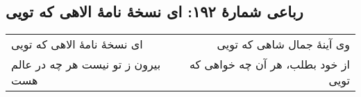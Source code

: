 \begin{center}
\section*{رباعی شمارهٔ ۱۹۲: ای نسخۀ نامۀ الاهی که تویی}
\label{sec:192}
\begin{longtable}{l p{0.5cm} r}
ای نسخهٔ نامهٔ الاهی که تویی
&&
وی آینهٔ جمال شاهی که تویی
\\
بیرون ز تو نیست هر چه در عالم هست
&&
از خود بطلب، هر آن چه خواهی که تویی
\\
\end{longtable}
\end{center}
